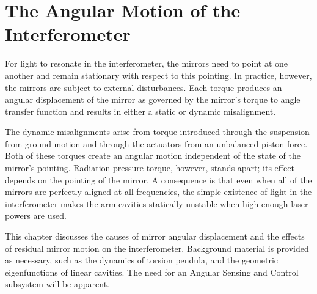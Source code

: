 \chapter{The Angular Motion of the Interferometer}











For light to resonate in the interferometer, the mirrors need to point at one another and remain stationary with respect to this pointing. In practice, however, the mirrors are subject to external disturbances. 
Each torque produces an angular displacement of the mirror as governed by the mirror's torque to angle transfer function and results in either a static or dynamic misalignment.

The dynamic misalignments arise from torque introduced through the suspension from ground motion and through the actuators from an unbalanced piston force. Both of these torques create an angular motion independent of the state of the mirror's pointing. Radiation pressure torque, however, stands apart; its effect depends on the pointing of the mirror. A consequence is that even when all of the mirrors are perfectly aligned at all frequencies, the simple existence of light in the interferometer makes the arm cavities statically unstable when high enough laser powers are used.

This chapter discusses the causes of mirror angular displacement and the effects of residual mirror motion on the interferometer. Background material is provided as necessary, such as the dynamics of torsion pendula, and the geometric eigenfunctions of linear cavities. The need for an Angular Sensing and Control subsystem will be apparent.




